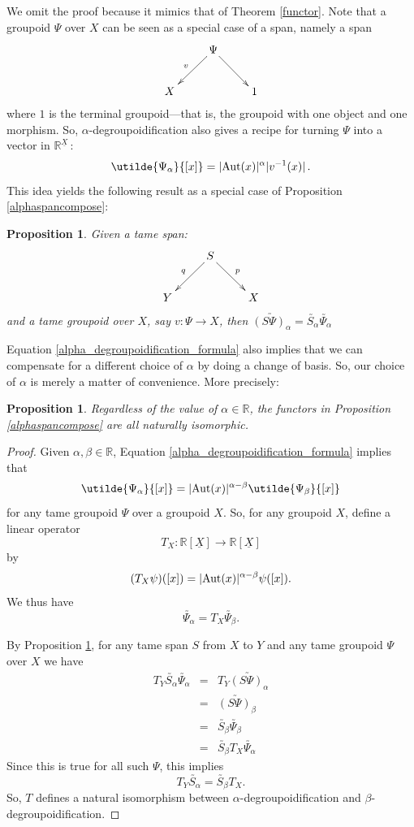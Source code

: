 \documentclass{article}
\renewcommand{\to}{\rightarrow}
\newcommand{\maps}{\colon}
\newcommand{\R}{{\mathbb R}}
\newcommand{\Aut}{{\rm Aut}}
\renewcommand{\u}[1]{\underline{#1}}
\newtheorem{proposition}[thm]{Proposition}
\begin{document}
We omit the proof because it mimics that of Theorem \ref{functor}.
Note that a groupoid $\Psi$ over $X$ can be seen as a special case of
a span, namely a span
\[\xymatrix{
 & \Psi \ar[dl]_{v} \ar[dr]^{} & \\
 X & & 1 \\
}\]
where $1$ is the terminal groupoid---that is, the groupoid
with one object and one morphism.  So, $\alpha$-degroupoidification
also gives a recipe for turning $\Psi$ into a vector in $\R^{\u{X}}\,$:
\begin{equation}
\label{alpha_degroupoidification_formula}
\utilde{\Psi_\alpha}{[x]} = |\Aut(x)|^\alpha {|v^{-1}(x)|} \,.
\end{equation}
This idea yields the following result as a special case of Proposition
\ref{alphaspancompose}:

\begin{proposition} 
\label{alpha_degroupoidification_vector}
Given a tame span:
\[\xymatrix{
& S \ar[dl]_{q} \ar[dr]^{p}& \\
Y & & X
}\]
and a tame groupoid over $X$, say $v\maps\Psi\to X$, then
$\utilde{(S\Psi)_\alpha}=\utilde{S_\alpha}\utilde{\Psi_\alpha}$
\end{proposition}

Equation \ref{alpha_degroupoidification_formula} also implies that we 
can compensate for a different choice of $\alpha$ by doing a change of
basis.  So, our choice of $\alpha$ is merely a matter of convenience.
More precisely:

\begin{proposition} 
Regardless of the value of $\alpha \in \R$, the
functors in Proposition \ref{alphaspancompose} are
all naturally isomorphic.
\end{proposition}

\begin{proof} 
Given $\alpha,\beta \in \R$, Equation 
\ref{alpha_degroupoidification_formula} implies that
\[
\utilde{\Psi_\alpha}{[x]} = |\Aut(x)|^{\alpha-\beta} 
\utilde{\Psi_\beta}{[x]} 
\]
for any tame groupoid $\Psi$ over a groupoid $X$.  So, for any
groupoid $X$, define a linear operator
\[    T_X \maps \R[\u{X}] \to \R[\u{X}]  \]
by
\[    (T_X \psi)([x]) = |\Aut(x)|^{\alpha-\beta} \psi([x])  .\]
We thus have
\[
\utilde{\Psi_\alpha} = T_X \utilde{\Psi_\beta}  .
\]

By Proposition
\ref{alpha_degroupoidification_vector}, for any tame span $S$ 
from $X$ to $Y$ and any tame groupoid $\Psi$ over $X$ we have
\[
\begin{array}{ccl}
 T_Y \utilde{S_\alpha} \utilde{\Psi_\alpha} 
&=& T_Y \utilde{(S\Psi)_\alpha} \\
&=& \utilde{(S\Psi)_\beta} \\
&=& \utilde{S_\beta} \utilde{\Psi_\beta} \\
&=& \utilde{S_\beta} T_X \utilde{\Psi_\alpha} 
\end{array}
\]
Since this is true for all such $\Psi$, this implies
\[ T_Y \utilde{S_\alpha} = \utilde{S_\beta} T_X  .\]
So, $T$ defines a natural isomorphism between $\alpha$-degroupoidification
and $\beta$-degroupoidification.
\end{proof}
\end{document}

